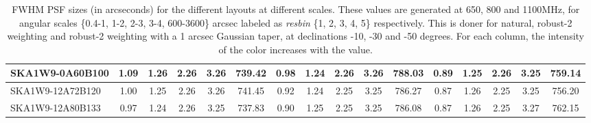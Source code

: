 \begin{table}[H]
{{\begin{tabular}{|lccccc||ccccc||ccccc|}
SKA1W9-0A60B100 & 1.09 \cellcolor{blue!47.65} & 1.26 \cellcolor{red!27.54} & 2.26 \cellcolor{green!60.00} & 3.26 \cellcolor{orange!46.70} & 739.42 \cellcolor{purple!40.24} & 0.98 \cellcolor{blue!48.10} & 1.24 \cellcolor{red!18.77} & 2.26 \cellcolor{green!45.00} & 3.26 \cellcolor{orange!47.59} & 788.03 \cellcolor{purple!47.47} & 0.89 \cellcolor{blue!33.68} & 1.25 \cellcolor{red!32.45} & 2.26 \cellcolor{green!60.00} & 3.25 \cellcolor{orange!19.39} & 759.14 \cellcolor{purple!38.79}\\ \hline 
SKA1W9-12A72B120 & 1.00 \cellcolor{blue!27.05} & 1.25 \cellcolor{red!19.24} & 2.26 \cellcolor{green!47.95} & 3.26 \cellcolor{orange!49.50} & 741.45 \cellcolor{purple!50.58} & 0.92 \cellcolor{blue!26.50} & 1.24 \cellcolor{red!18.00} & 2.25 \cellcolor{green!26.57} & 3.25 \cellcolor{orange!28.02} & 786.27 \cellcolor{purple!20.84} & 0.87 \cellcolor{blue!20.99} & 1.26 \cellcolor{red!40.01} & 2.25 \cellcolor{green!18.00} & 3.25 \cellcolor{orange!18.00} & 756.20 \cellcolor{purple!18.00}\\ \hline 
SKA1W9-12A80B133 & 0.97 \cellcolor{blue!18.00} & 1.24 \cellcolor{red!18.00} & 2.26 \cellcolor{green!33.84} & 3.25 \cellcolor{orange!18.00} & 737.83 \cellcolor{purple!32.15} & 0.90 \cellcolor{blue!18.00} & 1.25 \cellcolor{red!26.75} & 2.25 \cellcolor{green!18.00} & 3.25 \cellcolor{orange!18.00} & 786.08 \cellcolor{purple!18.00} & 0.87 \cellcolor{blue!18.00} & 1.26 \cellcolor{red!42.98} & 2.25 \cellcolor{green!32.00} & 3.27 \cellcolor{orange!60.00} & 762.15 \cellcolor{purple!60.00}\\ \hline 
\end{tabular}}
\vspace{-0.300000cm}
\hspace{1cm} 

\vspace{.25cm}
\caption{FWHM PSF sizes (in arcseconds) for the different layouts at different scales. These values are generated at 650, 800 and 1100MHz, for angular scales \{0.4-1, 1-2, 2-3, 3-4, 600-3600\} arcsec labeled as {\it resbin} \{1, 2, 3, 4, 5\} respectively. This is doner for natural, robust-2 weighting and robust-2 weighting with a 1 arcsec Gaussian taper, at declinations -10, -30 and -50 degrees. For each column, the intensity of the color increases with the value.}\label{tab:psf_mean}}
 \end{table}
